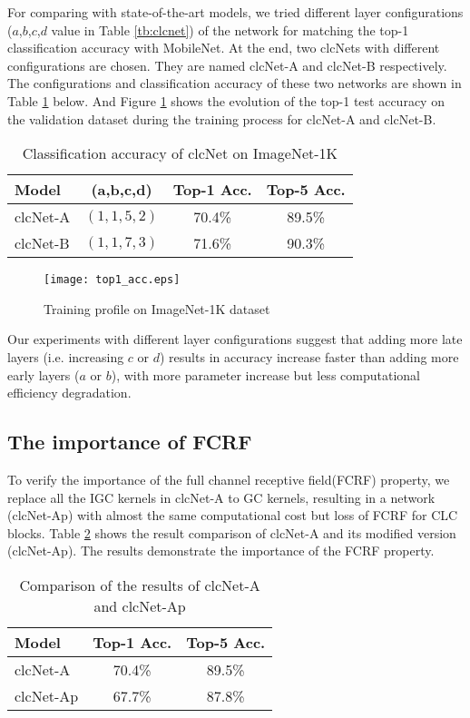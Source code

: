 \documentclass[10pt,twocolumn,letterpaper]{article}
\begin{document}
For comparing with state-of-the-art models, we tried different layer configurations ($a$,$b$,$c$,$d$ value in Table \ref{tb:clcnet}) of the network for matching the top-1 classification accuracy with MobileNet. At the end, two clcNets with different configurations are chosen. They are named clcNet-A and clcNet-B respectively. The configurations and classification accuracy of these two networks are shown in Table \ref{tb:exp_try} below. And Figure \ref{fig:train_profile} shows the evolution of the top-1 test accuracy on the validation dataset during the training process for clcNet-A and clcNet-B.
\begin{table}[h!]
\begin{center}
\begin{tabular}{l|c|c|c}
\hline
Model & (a,b,c,d) & Top-1 Acc.  & Top-5  Acc.\\
\hline\hline
clcNet-A  & $(1,1,5,2)$ & 70.4\%  & 89.5\% \\
clcNet-B  & $(1,1,7,3)$ & 71.6\%  & 90.3\% \\
\hline
\end{tabular}
\end{center}
\caption{Classification accuracy of clcNet on ImageNet-1K }
\label{tb:exp_try}
\end{table}
\begin{figure}[h!]
\begin{center}
\texttt{[image: top1\_acc.eps]}
\end{center}
   \caption{Training profile on ImageNet-1K dataset }
\label{fig:train_profile}
\end{figure}

Our experiments with different layer configurations suggest that adding more late layers (i.e. increasing $c$ or $d$) results in accuracy increase faster than adding more early layers ($a$ or $b$), with more parameter increase but less computational efficiency degradation.

\subsection{The importance of FCRF}
To verify the importance of the full channel receptive field(FCRF) property, we replace all the IGC kernels in clcNet-A to GC kernels, resulting in a network (clcNet-Ap) with almost the same computational cost but loss of FCRF for CLC blocks. Table \ref{tb:fcrf} shows the result comparison of clcNet-A and its modified version (clcNet-Ap). The results demonstrate the importance of the FCRF property.
\begin{table}[h!]
\begin{center}
\begin{tabular}{l|c|c}
\hline
Model &  Top-1 Acc.  & Top-5  Acc.\\
\hline\hline
clcNet-A  &  70.4\%  & 89.5\% \\
clcNet-Ap &  67.7\%  & 87.8\% \\
\hline
\end{tabular}
\end{center}
\caption{Comparison of the results of clcNet-A and clcNet-Ap}
\label{tb:fcrf}
\end{table}
\end{document}
